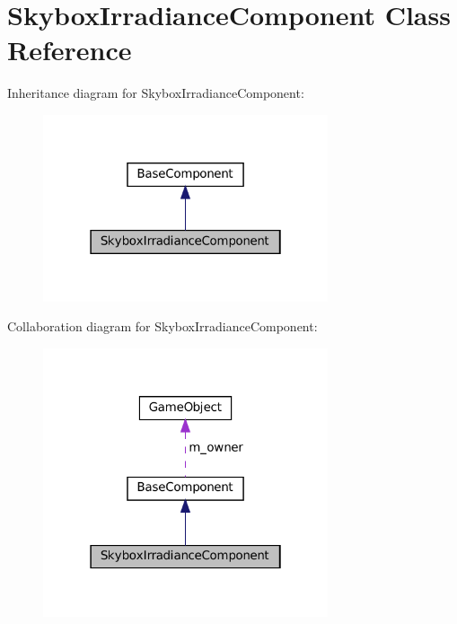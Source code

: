 \hypertarget{classSkyboxIrradianceComponent}{}\section{Skybox\+Irradiance\+Component Class Reference}
\label{classSkyboxIrradianceComponent}


Inheritance diagram for Skybox\+Irradiance\+Component\+:\nopagebreak
\begin{figure}[H]
\begin{center}
\leavevmode
\includegraphics[width=238pt]{classSkyboxIrradianceComponent__inherit__graph}
\end{center}
\end{figure}


Collaboration diagram for Skybox\+Irradiance\+Component\+:\nopagebreak
\begin{figure}[H]
\begin{center}
\leavevmode
\includegraphics[width=238pt]{classSkyboxIrradianceComponent__coll__graph}
\end{center}
\end{figure}

